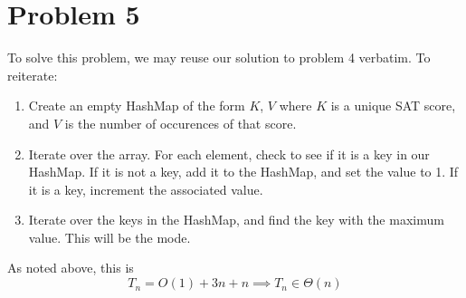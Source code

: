 \section*{Problem 5}

To solve this problem, we may reuse our solution to problem 4 verbatim. To reiterate:

\begin{enumerate}
    \item Create an empty HashMap of the form $K$, $V$ where $K$ is a 
    unique SAT score, and $V$ is the number of occurences of that score.
    \item Iterate over the array. For each element, check to see if it
          is a key in our HashMap.
        \subitem If it is not a key, add it to the HashMap, and set the
                 value to 1.
        \subitem If it is a key, increment the associated value.
    \item Iterate over the keys in the HashMap, and find the key with
          the maximum value. This will be the mode. 
\end{enumerate}

As noted above, this is
$$
    T_n = O(1) + 3n + n \implies T_n \in \Theta(n)
$$